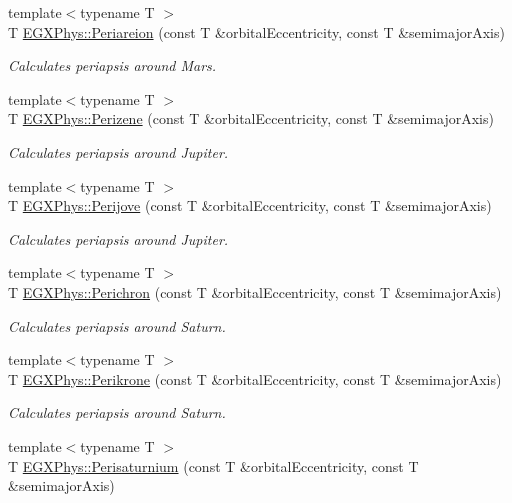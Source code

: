 \begin{DoxyCompactItemize}
{\footnotesize template$<$typename T $>$ }\\T \hyperlink{group___astrophysics_ga0617ba07a30b0fd0544c02f691bfae26}{E\+G\+X\+Phys\+::\+Periareion} (const T \&orbital\+Eccentricity, const T \&semimajor\+Axis)
\begin{DoxyCompactList}\small\item\em Calculates periapsis around Mars. \end{DoxyCompactList}\item 
{\footnotesize template$<$typename T $>$ }\\T \hyperlink{group___astrophysics_ga0523c65b7fc26e675388b2c3d38aa00b}{E\+G\+X\+Phys\+::\+Perizene} (const T \&orbital\+Eccentricity, const T \&semimajor\+Axis)
\begin{DoxyCompactList}\small\item\em Calculates periapsis around Jupiter. \end{DoxyCompactList}\item 
{\footnotesize template$<$typename T $>$ }\\T \hyperlink{group___astrophysics_ga075052f7ff9aa1d5fdf4501b493be86b}{E\+G\+X\+Phys\+::\+Perijove} (const T \&orbital\+Eccentricity, const T \&semimajor\+Axis)
\begin{DoxyCompactList}\small\item\em Calculates periapsis around Jupiter. \end{DoxyCompactList}\item 
{\footnotesize template$<$typename T $>$ }\\T \hyperlink{group___astrophysics_ga12b5e99aa2e3e7031ef6ce93060cf516}{E\+G\+X\+Phys\+::\+Perichron} (const T \&orbital\+Eccentricity, const T \&semimajor\+Axis)
\begin{DoxyCompactList}\small\item\em Calculates periapsis around Saturn. \end{DoxyCompactList}\item 
{\footnotesize template$<$typename T $>$ }\\T \hyperlink{group___astrophysics_gaa56f74c44a3583b8f0d13b821c1d7422}{E\+G\+X\+Phys\+::\+Perikrone} (const T \&orbital\+Eccentricity, const T \&semimajor\+Axis)
\begin{DoxyCompactList}\small\item\em Calculates periapsis around Saturn. \end{DoxyCompactList}\item 
{\footnotesize template$<$typename T $>$ }\\T \hyperlink{group___astrophysics_ga60a50d09d29ebe47cbbfc125c2ea42bf}{E\+G\+X\+Phys\+::\+Perisaturnium} (const T \&orbital\+Eccentricity, const T \&semimajor\+Axis)

\end{DoxyCompactItemize}
